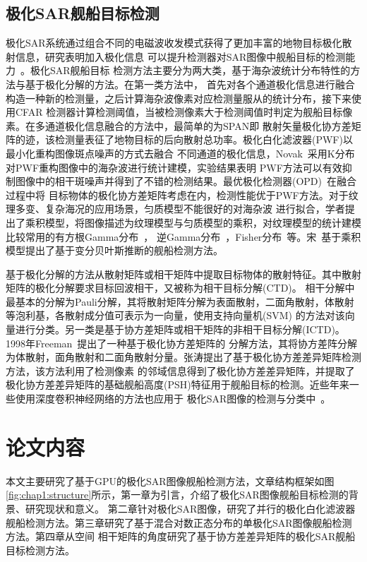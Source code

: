   \subsection{极化SAR舰船目标检测}
      极化SAR系统通过组合不同的电磁波收发模式获得了更加丰富的地物目标极化散射信息，研究表明加入极化信息
      可以提升检测器对SAR图像中舰船目标的检测能力~\cite{18677,Touzi2015Optimization}。极化SAR舰船目标
      检测方法主要分为两大类，基于海杂波统计分布特性的方法与基于极化分解的方法。在第一类方法中，
      首先对各个通道极化信息进行融合构造一种新的检测量，之后计算海杂波像素对应检测量服从的统计分布，接下来使用CFAR
      检测器计算检测阈值，当被检测像素大于检测阈值时判定为舰船目标像素。在多通道极化信息融合的方法中，最简单的为SPAN即
      散射矢量极化协方差矩阵的迹，该检测量表征了地物目标的后向散射总功率。极化白化滤波器(PWF)以最小化重构图像斑点噪声的方式去融合
      不同通道的极化信息，Novak~\cite{Novak1990Optimal}采用K分布对PWF重构图像中的海杂波进行统计建模，实验结果表明
      PWF方法可以有效抑制图像中的相干斑噪声并得到了不错的检测结果。最优极化检测器(OPD)~\cite{18677}在融合过程中将
      目标物体的极化协方差矩阵考虑在内，检测性能优于PWF方法。对于纹理多变、复杂海况的应用场景，匀质模型不能很好的对海杂波
      进行拟合，学者提出了乘积模型，将图像描述为纹理模型与匀质模型的乘积，对纹理模型的统计建模比较常用的有方根Gamma分布~\cite{Lee1994K}，
      逆Gamma分布~\cite{Freitas2005The}，Fisher分布~\cite{Bombrun2008Segmentation}等。宋~\cite{Song2017Ship}基于乘积模型提出了基于变分贝叶斯推断的舰船检测方法。

      基于极化分解的方法从散射矩阵或相干矩阵中提取目标物体的散射特征。其中散射矩阵的极化分解要求目标回波相干，又被称为相干目标分解(CTD)。
      相干分解中最基本的分解为Pauli分解，其将散射矩阵分解为表面散射，二面角散射，体散射等泡利基，各散射成分值可表示为一向量，使用支持向量机(SVM)
      的方法对该向量进行分类。另一类是基于协方差矩阵或相干矩阵的非相干目标分解(ICTD)。1998年Freeman~\cite{673687}提出了一种基于极化协方差矩阵的
      分解方法，其将协方差阵分解为体散射，面角散射和二面角散射分量。张涛\cite{Tao2017PolSAR}提出了基于极化协方差差异矩阵检测方法，该方法利用了检测像素
      的邻域信息得到了极化协方差差异矩阵，并提取了极化协方差差异矩阵的基础舰船高度(PSH)特征用于舰船目标的检测。近些年来一些使用深度卷积神经网络的方法也应用于
      极化SAR图像的检测与分类中~\cite{徐丰2017深度学习在}。


\section{论文内容}
  本文主要研究了基于GPU的极化SAR图像舰船检测方法，文章结构框架如图\ref{fig:chap1:structure}所示，第一章为引言，介绍了极化SAR图像舰船目标检测的背景、研究现状和意义。
  第二章针对极化SAR图像，研究了并行的极化白化滤波器舰船检测方法。第三章研究了基于混合对数正态分布的单极化SAR图像舰船检测方法。第四章从空间
  相干矩阵的角度研究了基于协方差差异矩阵的极化SAR舰船目标检测方法。


